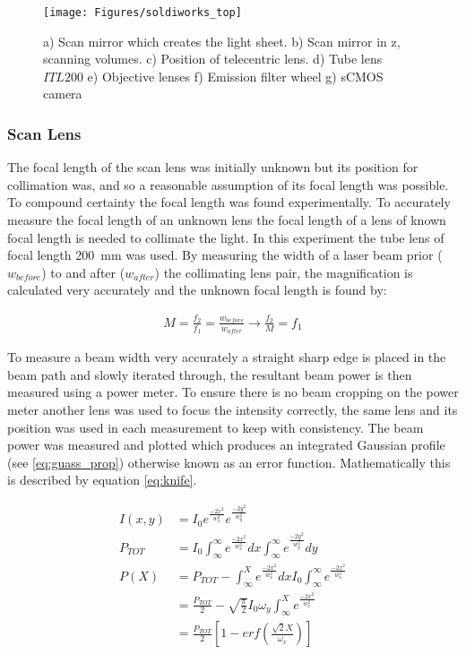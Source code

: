 \documentclass[10pt,a4paper]{report}
\begin{document}
\begin{spacing}{1.5}
\begin{figure}
	\centering
	\texttt{[image: Figures/soldiworks\_top]}
	\caption[Top down schematic of SPIM]{a) Scan mirror which creates the light sheet. b) Scan mirror in z, scanning volumes. c) Position of telecentric lens. d) Tube lens $ITL200$ e) Objective lenses f) Emission filter wheel g) sCMOS camera}
	\label{fig:soldiworks_top}
\end{figure}

\subsubsection{Scan Lens}

The focal length of the scan lens was initially unknown but its position for collimation was, and so a reasonable assumption of its focal length was possible. To compound certainty the focal length was found experimentally. To accurately measure the focal length of an unknown lens the focal length of a lens of known focal length is needed to collimate the light. In this experiment the tube lens of focal length \SI{200}{\milli\meter} was used. By measuring the width of a laser beam prior ($w_{before}$) to and after ($w_{after}$) the collimating lens pair, the magnification is calculated very accurately and the unknown focal length is found by:

\begin{align}
	M=\frac{f_2}{f_1}=\frac{w_{before}}{w_{after}}  \rightarrow \frac{f_2}{M} =f_{1}
\end{align}

To measure a beam width very accurately a straight sharp edge is placed in the beam path and slowly iterated through, the resultant beam power is then measured using a power meter. To ensure there is no beam cropping on the power meter another lens was used to focus the intensity correctly, the same lens and its position was used in each measurement to keep with consistency. The beam power was measured and plotted which produces an integrated Gaussian profile (see \eqref{eq:guass_prop}) otherwise known as an error function. Mathematically this is described by equation \eqref{eq:knife}.

\begin{align}
	I(x,y) &= I_0 e^{\frac{-2x^2}{w_x^2}}e^{\frac{-2y^2}{w_y^2}}\label{eq:guass_prop}\\\nonumber
	P_{TOT} &= I_0 \int_{\infty}^{\infty}e^{\frac{-2x^2}{w_x^2}} dx \int_{\infty}^{\infty}e^{\frac{-2y^2}{w_y^2}} dy\\\nonumber
	P(X) &= P_{TOT} - \int_{\infty}^{X}e^{\frac{-2x^2}{w_x^2}} dx I_0 \int_{\infty}^{\infty}e^{\frac{-2x^2}{w_x^2}} \\\nonumber
	&= \frac{P_{TOT}}{2} - \sqrt{\frac{\pi}{2}} I_0 \omega_y \int_{\infty}^{X}e^{\frac{-2x^2}{w_x^2}}\\
	& = \frac{P_{TOT}}{2} \left[1 - erf\left(\frac{\sqrt{2}X}{\omega_x}\right) \right] \label{eq:knife}
\end{align}


\end{spacing}
\end{document}
